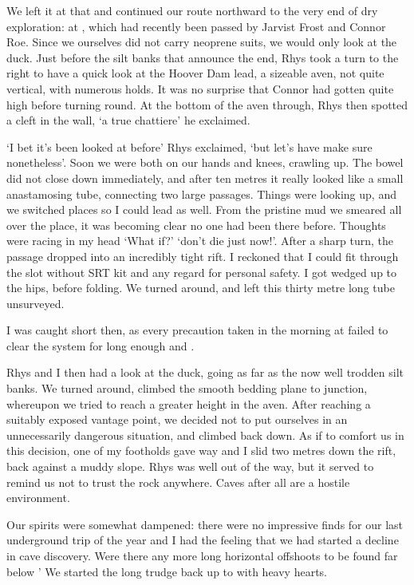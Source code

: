 We left it at that and continued our route northward to the very end of dry exploration: at , which had recently been passed by Jarvist Frost and Connor Roe. Since we ourselves did not carry neoprene suits, we would only look at the duck. Just before the silt banks that announce the end, Rhys took a turn to the right to have a quick look at the Hoover Dam lead, a sizeable aven, not quite vertical, with numerous holds. It was no surprise that Connor had gotten quite high before turning round. At the bottom of the aven through, Rhys then spotted a cleft in the wall, `a true chattiere' he exclaimed.

`I bet it's been looked at before' Rhys exclaimed, `but let's have make sure nonetheless'. Soon we were both on our hands and knees, crawling up. The bowel did not close down immediately, and after ten metres it really looked like a small anastamosing tube, connecting two large passages. Things were looking up, and we switched places so I could lead as well. From the pristine mud we smeared all over the place, it was becoming clear no one had been there before. Thoughts were racing in my head `What if?' `don't die just now!'. After a sharp turn, the passage dropped into an incredibly tight rift. I reckoned that I could fit through the slot without SRT kit and any regard for personal safety. I got wedged up to the hips, before folding. We turned around, and left this thirty metre long tube unsurveyed. 

I was caught short then, as every precaution taken in the morning at  failed to clear the system for long enough and . 

Rhys and I then had a look at the duck, going as far as the now well trodden silt banks. We turned around, climbed the smooth bedding plane to  junction, whereupon we tried to reach a greater height in the aven. After reaching a suitably exposed vantage point, we decided not to put ourselves in an unnecessarily dangerous situation, and climbed back down. As if to comfort us in this decision, one of my footholds gave way and I slid two metres down the rift, back against a muddy slope. Rhys was well out of the way, but it served to remind us not to trust the rock anywhere. Caves after all are a hostile environment. 

Our spirits were somewhat dampened: there were no impressive finds for our last underground trip of the year and I had the feeling that we had started a decline in cave discovery. Were there any more long horizontal offshoots to be found far below ' We started the long trudge back up to  with heavy hearts.

